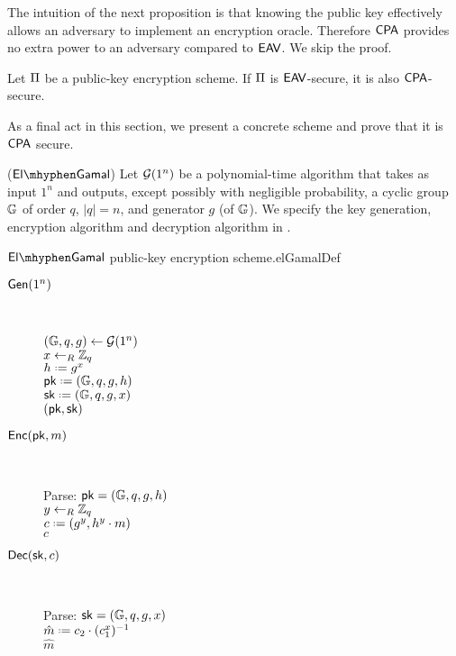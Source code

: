 The intuition of the next proposition is that knowing the public key effectively allows an adversary to implement an encryption oracle. Therefore $\mathsf{CPA}$ provides no extra power to an adversary compared to $\mathsf{EAV}$. We skip the proof. 

\begin{prop}
Let $\operatorname{\Pi}$ be a public-key encryption scheme. If $\operatorname{\Pi}$ is $\mathsf{EAV}$-secure, it is also $\mathsf{CPA}$-secure. 
\end{prop}

As a final act in this section, we present a concrete scheme and prove that it is $\mathsf{CPA}$ secure.

\begin{defn}
(\textbf{$\elGamal$}) Let $\operatorname{\mathcal{G}}(1^n)$ be a polynomial-time algorithm that takes as input $1^n$ and outputs, except possibly with negligible probability, a cyclic group $\mathbb{G}$ of order $q$, $\vert q\vert = n$, and generator $g$ (of $\mathbb{G}$). We specify the  key generation, encryption algorithm and decryption algorithm in . 
\end{defn}

\begin{boxfigGame}{$\elGamal$ public-key encryption scheme.}{elGamalDef}
  \begin{description}
 	\item[\underline{$\operatorname{\mathsf{Gen}}(1^n)$}] ~
 	
 		$(\mathbb{G},q,g)\leftarrow\operatorname{\mathcal{G}}(1^n)$ \\
 		$x\leftarrow_R\mathbb{Z}_q$ \\
 		$h\defeq g^x$ \\
 		$\pk\defeq (\cgroup,\order,\generator,h)$ \\
 		$\sk\defeq (\cgroup,\order,\generator,x)$ \\
 		\Ret $(\mathsf{pk},\mathsf{sk})$

	\item[\underline{$\operatorname{\mathsf{Enc}}(\mathsf{pk},m)$}] ~
	
		Parse: $\mathsf{pk} = (\mathbb{G},q,g,h)$ \\
		$y\leftarrow_R\mathbb{Z}_q$ \\
		$c \defeq (g^y,h^y\cdot m)$ \\		
		\Ret $c$
		
	\item[\underline{$\operatorname{\mathsf{Dec}}(\mathsf{sk},c)$}] ~
	
		Parse: $\mathsf{sk} = (\mathbb{G},q,g,x)$ \\
		$\hat{m} \defeq c_2\cdot (c_1^x)^{-1}$ \\
		\Ret $\hat{m}$
		\smallskip
  \end{description}
\end{boxfigGame}

